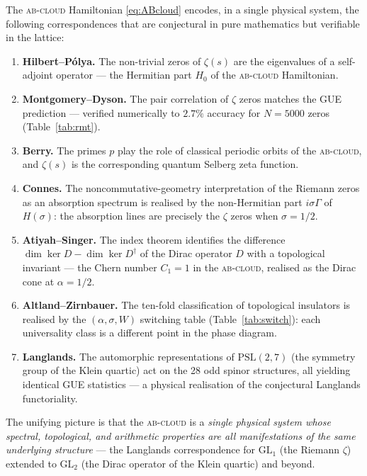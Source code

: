 \documentclass[11pt,a4paper]{article}
\theoremstyle{plain}
\theoremstyle{definition}
\theoremstyle{remark}
\newcommand{\Abcloud}{\textsc{ab-cloud}}
\begin{document}
\begin{keyclaim}[title={The \Abcloud{} as a physical Langlands programme}]
The \Abcloud{} Hamiltonian \eqref{eq:ABcloud} encodes, in a single physical system, the following correspondences that are conjectural in pure mathematics but verifiable in the lattice:
\begin{enumerate}[label=(\arabic*),leftmargin=*,itemsep=2pt]
    \item \textbf{Hilbert--Pólya.} The non-trivial zeros of $\zeta(s)$ are the eigenvalues of a self-adjoint operator — the Hermitian part $H_0$ of the \Abcloud{} Hamiltonian.
    \item \textbf{Montgomery--Dyson.} The pair correlation of $\zeta$ zeros matches the GUE prediction — verified numerically to $2.7\%$ accuracy for $N = 5000$ zeros (Table~\ref{tab:rmt}).
    \item \textbf{Berry.} The primes $p$ play the role of classical periodic orbits of the \Abcloud{}, and $\zeta(s)$ is the corresponding quantum Selberg zeta function.
    \item \textbf{Connes.} The noncommutative-geometry interpretation of the Riemann zeros as an absorption spectrum is realised by the non-Hermitian part $i\sigma\Gamma$ of $H(\sigma)$: the absorption lines are precisely the $\zeta$ zeros when $\sigma = 1/2$.
    \item \textbf{Atiyah--Singer.} The index theorem identifies the difference $\dim\ker D - \dim\ker D^\dagger$ of the Dirac operator $D$ with a topological invariant — the Chern number $C_1 = 1$ in the \Abcloud{}, realised as the Dirac cone at $\alpha = 1/2$.
    \item \textbf{Altland--Zirnbauer.} The ten-fold classification of topological insulators is realised by the $(\alpha,\sigma,W)$ switching table (Table~\ref{tab:switch}): each universality class is a different point in the phase diagram.
    \item \textbf{Langlands.} The automorphic representations of $\mathrm{PSL}(2,7)$ (the symmetry group of the Klein quartic) act on the 28 odd spinor structures, all yielding identical GUE statistics — a physical realisation of the conjectural Langlands functoriality.
\end{enumerate}
\end{keyclaim}

The unifying picture is that the \Abcloud{} is a \emph{single physical system whose spectral, topological, and arithmetic properties are all manifestations of the same underlying structure} — the Langlands correspondence for $\mathrm{GL}_1$ (the Riemann $\zeta$) extended to $\mathrm{GL}_2$ (the Dirac operator of the Klein quartic) and beyond.
\end{document}
